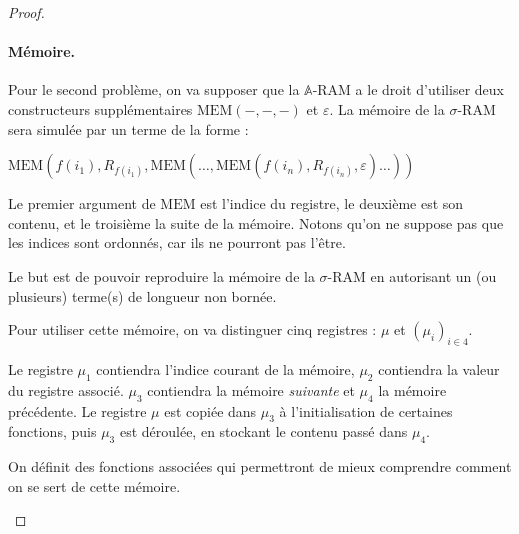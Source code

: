 \documentclass{report}
\newcommand{\bbA}{\mathbb{A}}
\begin{document}
\begin{proof}
					
					\paragraph{Mémoire.}
					\label{par:A_RAM_memoire}
					Pour le second problème, on va supposer que la $\bbA$-RAM a le droit d'utiliser deux constructeurs supplémentaires $\text{MEM}(-,-,-)$ et $\varepsilon$. La mémoire de la $\sigma$-RAM sera simulée par un terme de la forme : 
					
					$\text{MEM}(f(i_1), R_{f(i_1)}, \text{MEM}( \dots, \text{MEM}(f(i_n), R_{f(i_n)}, \varepsilon) \dots ) )$
					
					Le premier argument de $\text{MEM}$ est l'indice du registre, le deuxième est son contenu, et le troisième la suite de la mémoire. Notons qu'on ne suppose pas que les indices sont ordonnés, car ils ne pourront pas l'être. 
					
					Le but est de pouvoir reproduire la mémoire de la $\sigma$-RAM en autorisant un (ou plusieurs) terme(s) de longueur non bornée. 
					
					Pour utiliser cette mémoire, on va distinguer cinq registres : $\mu$ et $\left( \mu_i \right)_{i \in 4}$.
					
					Le registre $\mu_1$ contiendra l'indice courant de la mémoire, $\mu_2$ contiendra la valeur du registre associé. $\mu_3$ contiendra la mémoire \emph{suivante} et $\mu_4$ la mémoire précédente. Le registre $\mu$ est copiée dans $\mu_3$ à l'initialisation de certaines fonctions, puis $\mu_3$ est déroulée, en stockant le contenu passé dans $\mu_4$. 
					
					On définit des fonctions associées qui permettront de mieux comprendre comment on se sert de cette mémoire. 
					
					\espace
					
					\begin{algorithm}[H]
						\label{algo:A_RAM_fn_INSERT}
						
						
						

\end{algorithm}
\end{proof}
\end{document}
